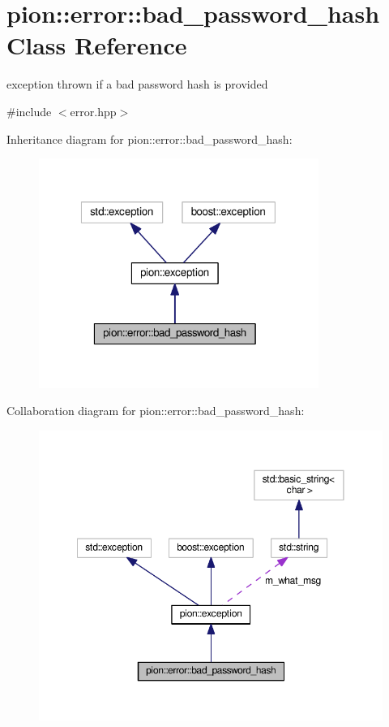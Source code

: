 \hypertarget{classpion_1_1error_1_1bad__password__hash}{\section{pion\-:\-:error\-:\-:bad\-\_\-password\-\_\-hash Class Reference}
\label{classpion_1_1error_1_1bad__password__hash}
}


exception thrown if a bad password hash is provided  




{\ttfamily \#include $<$error.\-hpp$>$}



Inheritance diagram for pion\-:\-:error\-:\-:bad\-\_\-password\-\_\-hash\-:
\nopagebreak
\begin{figure}[H]
\begin{center}
\leavevmode
\includegraphics[width=259pt]{classpion_1_1error_1_1bad__password__hash__inherit__graph}
\end{center}
\end{figure}


Collaboration diagram for pion\-:\-:error\-:\-:bad\-\_\-password\-\_\-hash\-:
\nopagebreak
\begin{figure}[H]
\begin{center}
\leavevmode
\includegraphics[width=350pt]{classpion_1_1error_1_1bad__password__hash__coll__graph}
\end{center}
\end{figure}
